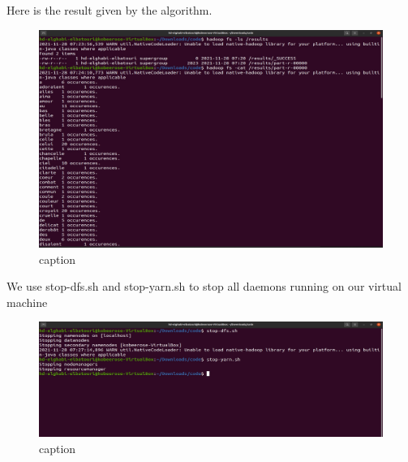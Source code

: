 \begin{spacing}{1.2}
\par Here is the result given by the algorithm.
\\
\begin{figure}[!htb] 
\begin{center} 
\includegraphics[width=1\linewidth]{Big_Data/Hadoop/1-Node Map_Reduce/Showing results.jpg} 
\end{center} 
\caption{caption} 
\end{figure} 
\FloatBarrier

\par We use stop-dfs.sh and stop-yarn.sh to stop all daemons running on our virtual machine
\\
\begin{figure}[!htb] 
\begin{center} 
\includegraphics[width=1\linewidth]{Big_Data/Hadoop/1-Node Map_Reduce/Stopping Hadoop and Yarn.jpg} 
\end{center} 
\caption{caption} 
\end{figure} 
\FloatBarrier


\end{spacing}